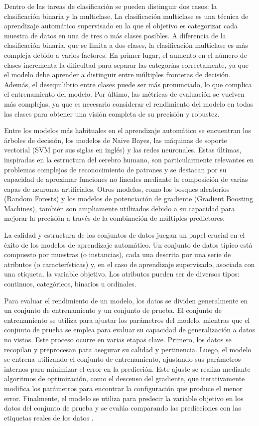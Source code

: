 Dentro de las tareas de clasificación se pueden distinguir dos casos: la clasificación binaria y la multiclase. La clasificación multiclase es una técnica de aprendizaje automático supervisado en la que el objetivo es categorizar cada muestra de datos en una de tres o más clases posibles. A diferencia de la clasificación binaria, que se limita a dos clases, la clasificación multiclase es más compleja debido a varios factores. En primer lugar, el aumento en el número de clases incrementa la dificultad para separar las categorías correctamente, ya que el modelo debe aprender a distinguir entre múltiples fronteras de decisión. Además, el desequilibrio entre clases puede ser más pronunciado, lo que complica el entrenamiento del modelo. Por último, las métricas de evaluación se vuelven más complejas, ya que es necesario considerar el rendimiento del modelo en todas las clases para obtener una visión completa de su precisión y robustez. 

Entre los modelos más habituales en el aprendizaje automático \cite{hastie2009elements} se encuentran los árboles de decisión, los modelos de Naive Bayes, las máquinas de soporte vectorial (SVM por sus siglas en inglés) y las redes neuronales. Estas últimas, inspiradas en la estructura del cerebro humano, son particularmente relevantes en problemas complejos de reconocimiento de patrones y se destacan por su capacidad de aproximar funciones no lineales mediante la composición de varias capas de neuronas artificiales. Otros modelos, como los bosques aleatorios (Random Forests) y los modelos de potenciación de gradiente (Gradient Boosting Machines), también son ampliamente utilizados debido a su capacidad para mejorar la precisión a través de la combinación de múltiples predictores.

La calidad y estructura de los conjuntos de datos juegan un papel crucial en el éxito de los modelos de aprendizaje automático. Un conjunto de datos típico está compuesto por muestras (o instancias), cada una descrita por una serie de atributos (o características) y, en el caso de aprendizaje supervisado, asociada con una etiqueta, la variable objetivo. Los atributos pueden ser de diversos tipos: continuos, categóricos, binarios u ordinales.

Para evaluar el rendimiento de un modelo, los datos se dividen generalmente en un conjunto de entrenamiento y un conjunto de prueba. El conjunto de entrenamiento se utiliza para ajustar los parámetros del modelo, mientras que el conjunto de prueba se emplea para evaluar su capacidad de generalización a datos no vistos. Este proceso ocurre en varias etapas clave. Primero, los datos se recopilan y preprocesan para asegurar su calidad y pertinencia. Luego, el modelo se entrena utilizando el conjunto de entrenamiento, ajustando sus parámetros internos para minimizar el error en la predicción. Este ajuste se realiza mediante algoritmos de optimización, como el descenso del gradiente, que iterativamente modifica los parámetros para encontrar la configuración que produce el menor error. Finalmente, el modelo se utiliza para predecir la variable objetivo en los datos del conjunto de prueba y se evalúa comparando las predicciones con las etiquetas reales de los datos
\cite{watt2020machine}.

